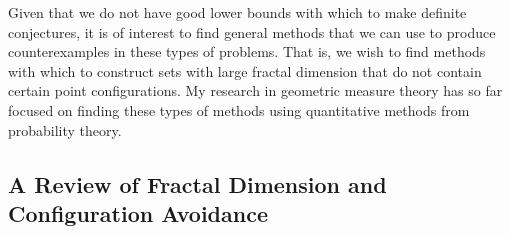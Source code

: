 \documentclass[11pt]{article}
\DeclareMathOperator{\RR}{\mathbb{R}}
\begin{document}
Given that we do not have good lower bounds with which to make definite conjectures, it is of interest to find general methods that we can use to produce counterexamples in these types of problems. That is, we wish to find methods with which to construct sets with large fractal dimension that do not contain certain point configurations. My research in geometric measure theory has so far focused on finding these types of methods using quantitative methods from probability theory.

\subsection{A Review of Fractal Dimension and Configuration Avoidance}


\end{document}
